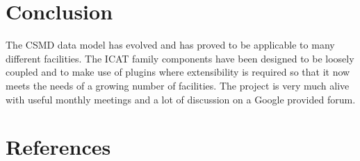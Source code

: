 \documentclass[a4paper]{jpconf}
\begin{document}
\section{Conclusion}
The CSMD data model has evolved and has proved to be applicable to
many different facilities. The ICAT family components have been
designed to be loosely coupled and to make use of plugins where
extensibility is required so that it now meets the needs of a growing
number of facilities. The project is very much alive with useful
monthly meetings and a lot of discussion on a Google provided forum.

\section*{References}


\end{document}
